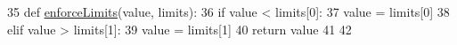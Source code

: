 \begin{DoxyCode}
35 \textcolor{keyword}{def }\hyperlink{namespacesoftware_1_1chipwhisperer_1_1analyzer_1_1attacks_1_1__generic__parameters_abcd215b51e9572a0f8de005212077184}{enforceLimits}(value, limits):
36     \textcolor{keywordflow}{if} value < limits[0]:
37         value = limits[0]
38     \textcolor{keywordflow}{elif} value > limits[1]:
39         value = limits[1]
40     \textcolor{keywordflow}{return} value
41 
42 
\end{DoxyCode}
